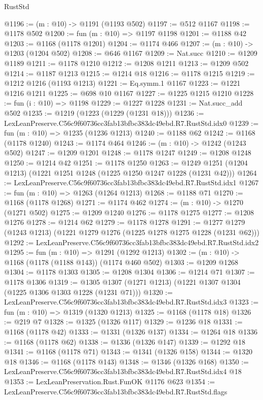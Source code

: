 \begin{lexlean}{RustStd}
\begin{coremodule}
@1196 := (m : @10) -> @1191 (@1193 @502)
@1197 := @512 @1167
@1198 := @1178 @502
@1200 := fun (m : @10) => @1197 @1198
@1201 := @1188 @42
@1203 := @1168 (@1178 @1201)
@1204 := @1174 @466
@1207 := (m : @10) -> @1203 (@1204 @502)
@1208 := @646 @1167
@1209 := Nat.succ
@1210 := @1209 @1189
@1211 := @1178 @1210
@1212 := @1208 @1211
@1213 := @1209 @502
@1214 := @1187 @1213
@1215 := @1214 @18
@1216 := @1178 @1215
@1219 := @1212 @1216 (@1193 @1213)
@1221 := Eq.symm.{1} @1167
@1223 := @1221 @1216 @1211
@1225 := @698 @10 @1167
@1227 := @1225 @1215 @1210
@1228 := fun (i : @10) => @1198
@1229 := @1227 @1228
@1231 := Nat.succ_add @502
@1235 := @1219 (@1223 (@1229 (@1231 @18)))
@1236 := LexLeanPreserve.C56c9f60736cc3fab13bfbc383dc49ebd.R7.RustStd.idx0
@1239 := fun (m : @10) => @1235 (@1236 @1213)
@1240 := @1188 @62
@1242 := @1168 (@1178 @1240)
@1243 := @1174 @464
@1246 := (m : @10) -> @1242 (@1243 @502)
@1247 := @1209 @1201
@1248 := @1178 @1247
@1249 := @1208 @1248
@1250 := @1214 @42
@1251 := @1178 @1250
@1263 := @1249 @1251 (@1204 @1213) (@1221 @1251 @1248 (@1225 @1250 @1247 @1228 (@1231 @42)))
@1264 := LexLeanPreserve.C56c9f60736cc3fab13bfbc383dc49ebd.R7.RustStd.idx1
@1267 := fun (m : @10) => @1263 (@1264 @1213)
@1268 := @1188 @71
@1270 := @1168 (@1178 @1268)
@1271 := @1174 @462
@1274 := (m : @10) -> @1270 (@1271 @502)
@1275 := @1209 @1240
@1276 := @1178 @1275
@1277 := @1208 @1276
@1278 := @1214 @62
@1279 := @1178 @1278
@1291 := @1277 @1279 (@1243 @1213) (@1221 @1279 @1276 (@1225 @1278 @1275 @1228 (@1231 @62)))
@1292 := LexLeanPreserve.C56c9f60736cc3fab13bfbc383dc49ebd.R7.RustStd.idx2
@1295 := fun (m : @10) => @1291 (@1292 @1213)
@1302 := (m : @10) -> @1168 (@1178 (@1188 @143)) (@1174 @460 @502)
@1303 := @1209 @1268
@1304 := @1178 @1303
@1305 := @1208 @1304
@1306 := @1214 @71
@1307 := @1178 @1306
@1319 := @1305 @1307 (@1271 @1213) (@1221 @1307 @1304 (@1225 @1306 @1303 @1228 (@1231 @71)))
@1320 := LexLeanPreserve.C56c9f60736cc3fab13bfbc383dc49ebd.R7.RustStd.idx3
@1323 := fun (m : @10) => @1319 (@1320 @1213)
@1325 := @1168 (@1178 @18)
@1326 := @219 @7
@1328 := @1325 (@1326 @117)
@1329 := @1236 @18
@1331 := @1168 (@1178 @42)
@1333 := @1331 (@1326 @137)
@1334 := @1264 @18
@1336 := @1168 (@1178 @62)
@1338 := @1336 (@1326 @147)
@1339 := @1292 @18
@1341 := @1168 (@1178 @71)
@1343 := @1341 (@1326 @158)
@1344 := @1320 @18
@1346 := @1168 (@1178 @143)
@1348 := @1346 (@1326 @168)
@1350 := LexLeanPreserve.C56c9f60736cc3fab13bfbc383dc49ebd.R7.RustStd.idx4 @18
@1353 := LexLeanPreservation.Rust.FunOK @1176 @623
@1354 := LexLeanPreserve.C56c9f60736cc3fab13bfbc383dc49ebd.R7.RustStd.flags

\end{coremodule}
\end{lexlean}
